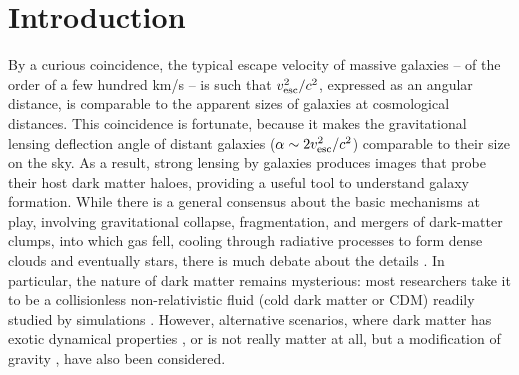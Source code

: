 
\section{Introduction}

By a curious coincidence, the typical escape velocity of massive
galaxies -- of the order of a few hundred km/s -- is such that $v_{\rm
  esc}^2/c^2$, expressed as an angular distance, is comparable to the
apparent sizes of galaxies at cosmological distances.  This
coincidence is fortunate, because it makes the gravitational lensing
deflection angle of distant galaxies ($\alpha\sim 2v_{\rm esc}^2/c^2$)
comparable to their size on the sky. As a result, strong lensing by
galaxies produces images that probe their host dark matter haloes,
providing a useful tool to understand galaxy formation.  While there
is a general consensus about the basic mechanisms at play, involving
gravitational collapse, fragmentation, and mergers of dark-matter
clumps, into which gas fell, cooling through radiative processes to
form dense clouds and eventually stars, there is much debate about the
details \citep[for a summary, see][]{2012RAA....12..917S}.  In
particular, the nature of dark matter remains mysterious: most
researchers take it to be a collisionless non-relativistic fluid (cold
dark matter or CDM) readily studied by simulations \citep[for example,
  the influential Millennium
  simulation,][]{2005Natur.435..629S}. However, alternative scenarios,
where dark matter has exotic dynamical properties
\citep{2010MNRAS.405...77S,2016ApJ...818...89S}, or is not really
matter at all, but a modification of gravity
\citep{2016PhRvL.117t1101M}, have also been considered.

